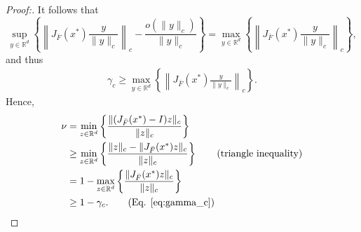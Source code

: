 \documentclass[10pt,a4paper]{amsart}
\begin{document}
\begin{proof}[Proof:]
It follows that
\[ \sup_{y\in\mathbb{R}^d} \left\{ \left\| J_{\bar{F}}(x^*) \frac{y}{\|y\|_c} \right\|_c - \frac{o(\|y\|_c)}{\|y\|_c} \right\} = \max_{y\in\mathbb{R}^d} \left\{ \left\| J_{\bar{F}}(x^*) \frac{y}{\|y\|_c} \right\|_c \right\}, \]
and thus
\begin{align}\label{eq:gamma_c}
\gamma_c \geq \max_{y\in\mathbb{R}^d} \left\{ \left\| J_{\bar{F}}(x^*) \frac{y}{\|y\|_c} \right\|_c \right\}. 
\end{align} 
Hence,
\begin{align*}
\nu &= \min_{z\in\mathbb{R}^d} \left\{\frac{\|(J_{\bar{F}}(x^*)-I)z\|_c}{\|z\|_c} \right\} \\
&\geq \min_{z\in\mathbb{R}^d} \left\{ \frac{\|z\|_c - \|J_{\bar{F}}(x^*)z\|_c}{\|z\|_c} \right\} \tag{triangle inequality}\\
& = 1- \max_{z\in\mathbb{R}^d} \left\{ \frac{\|J_{\bar{F}}(x^*)z\|_c}{\|z\|_c} \right\} \\
& \geq 1- \gamma_c.\tag{Eq. \eqref{eq:gamma_c}}
\end{align*}
\end{proof}
\end{document}
